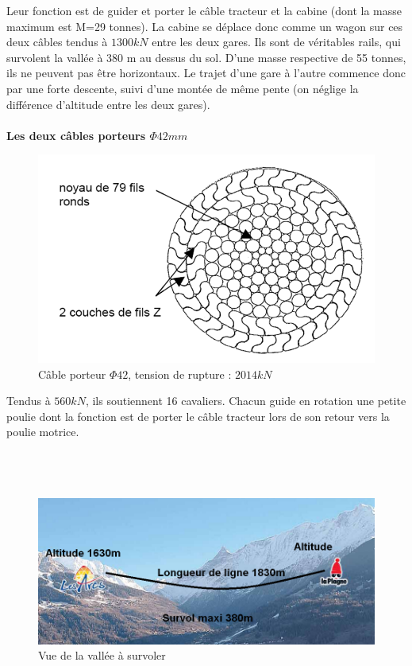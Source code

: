 Leur fonction est de guider et porter le câble tracteur et la cabine (dont la masse maximum est M=29 tonnes). La cabine se déplace donc comme un wagon sur ces deux câbles tendus à $1300kN$ entre les deux gares. Ils sont de véritables rails, qui survolent la vallée à 380 m au dessus du sol. D'une masse respective de 55 tonnes, ils ne peuvent pas être horizontaux. Le trajet d'une gare à l'autre commence donc par une forte descente, suivi d'une montée de même pente (on néglige la différence d'altitude entre les deux gares).
\\ ~\ \\
\textbf{Les deux câbles porteurs $\Phi 42mm$}

\begin{figure}
	\vspace{-20pt}
	\centering \includegraphics[width=0.9\linewidth]{img/fig06}
	\caption{Câble porteur	 $\Phi42$, tension de rupture : $2014kN$}
	\label{fig06}
\end{figure}

Tendus à $560kN$, ils soutiennent 16 cavaliers. Chacun guide en rotation une petite poulie dont la fonction est de porter le câble tracteur lors de son retour vers la poulie motrice.
\\ ~\ \\ ~\ \\ ~\ \\
\newpage

\begin{figure}[!h]
\centering
\includegraphics[width=0.6\linewidth]{img/fig07}
\caption{Vue de la vallée à survoler}
\label{fig07}
\end{figure}

